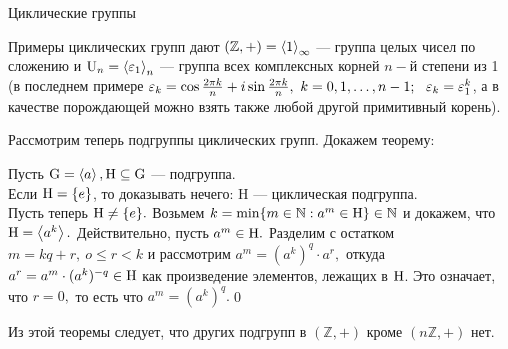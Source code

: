 \centerline{Циклические группы}

Примеры циклических групп дают $(\mathbb{Z},+)=\left\langle1\right\rangle_\infty$ --- группа целых чисел по сложению и ${\rm U}_n=\left\langle\varepsilon_1\right\rangle_n$ --- группа всех комплексных корней $n-$й степени из 1
(в последнем примере $\eps_k=\cos\frac{2\pi k}n+i\sin\frac{2\pi k}n,\ k=0,1,\dots,n-1;\ \ \eps_k=\eps_1^k$, а в качестве порождающей можно взять также
любой другой примитивный корень).

Рассмотрим теперь подгруппы циклических групп. Докажем теорему:


\dok Пусть ${\rm G}=\left\langle a\right\rangle,{\rm H}\subseteq{\rm G}$ --- подгруппа.\\ Если ${\rm H}=\{e\}$, то доказывать нечего: \mr H --- циклическая подгруппа.
\\Пусть теперь ${\rm H}\ne\{e\}.$ Возьмем $k=\min\{m\in\mathbb{N} : a^m\in{\rm H}\}\in\mathbb{N}$ и
докажем, что ${\rm H}=\left\langle a^k\right\rangle.$ Действительно, пусть $a^m\in{\rm H}.$ Разделим с остатком $m=kq+r,\ o\le r<k$ и рассмотрим $a^m=(a^k)^q\cdot a^r,$
откуда $a^r=a^m\cdot(a^k)^{-q}\in {\rm H}$ как произведение элементов, лежащих в ${\rm H}$. Это означает, что $r=0,$ то есть что $a^m=(a^k)^q.$\quad\qed

Из этой теоремы следует, что других подгрупп в $(\mathbb{Z}, +)$ кроме $(n\mathbb Z,+)$ нет.


